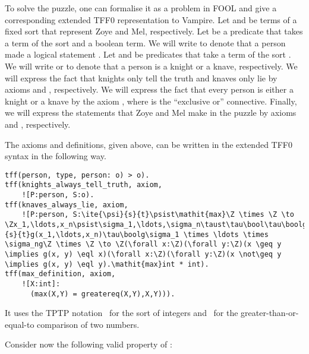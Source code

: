 \newcommand{\knight}{\mathit{Knight}}
\newcommand{\knave}{\mathit{Knave}}
\newcommand{\says}{\mathit{Says}}
\newcommand{\statement}{\mathit{statement}}
\newcommand{\person}{\mathit{person}}
\newcommand{\zoye}{\mathit{zoye}}
\newcommand{\mel}{\mathit{mel}}
To solve the puzzle, one can formalise it as a problem in FOOL and give a corresponding extended TFF0 representation to Vampire. Let  and  be terms of a fixed sort  that represent Zoye and Mel, respectively. Let  be a predicate that takes a term of the sort  and a boolean term. We will write  to denote that a person  made a logical statement . Let  and  be predicates that take a term of the sort . We will write  or  to denote that a person  is a knight or a knave, respectively. We will express the fact that knights only tell the truth and knaves only lie by axioms  and , respectively. We will express the fact that every person is either a knight or a knave by the axiom , where  is the ``exclusive or'' connective. Finally, we will express the statements that Zoye and Mel make in the puzzle by axioms  and , respectively.

The axioms and definitions, given above, can be written in the extended TFF0 syntax in the following way.
\begin{lstlisting}
tff(person, type, person: o) > o).
tff(knights_always_tell_truth, axiom,
    ![P:person, S:o).
tff(knaves_always_lie, axiom,
    ![P:person, S:\ite{\psi}{s}{t}\psist\mathit{max}\Z \times \Z \to \Zx_1,\ldots,x_n\psist\sigma_1,\ldots,\sigma_n\taust\tau\bool\tau\boolg\ite{\psi}{s}{t}g(x_1,\ldots,x_n)\tau\boolg\sigma_1 \times \ldots \times \sigma_ng\Z \times \Z \to \Z(\forall x:\Z)(\forall y:\Z)(x \geq y \implies g(x, y) \eql x)(\forall x:\Z)(\forall y:\Z)(x \not\geq y \implies g(x, y) \eql y).\mathit{max}int * int).
tff(max_definition, axiom,
    ![X:int]:
      (max(X,Y) = greatereq(X,Y),X,Y))).
\end{lstlisting}It uses the TPTP notation \dint\ for the sort of integers and \dgreatereq\ for the greater-than-or-equal-to comparison of two numbers.



Consider now the following valid property of :


